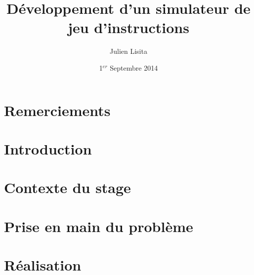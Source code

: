 \documentclass[a4paper,11pt]{article}
\begin{document}
\setlength{\parskip}{0.5em}%
\baselineskip 14pt


\title{\bf \huge Développement d'un simulateur de jeu d'instructions}
\author{Julien Lisita}
\date{1$^{er}$ Septembre 2014}

\maketitle
\newpage


\section{Remerciements}


\tableofcontents {}
\listoffigures


\section{Introduction}
\label{introduction}

\section{Contexte du stage}

\section{Prise en main du problème}

\section{Réalisation}

\end{document}
